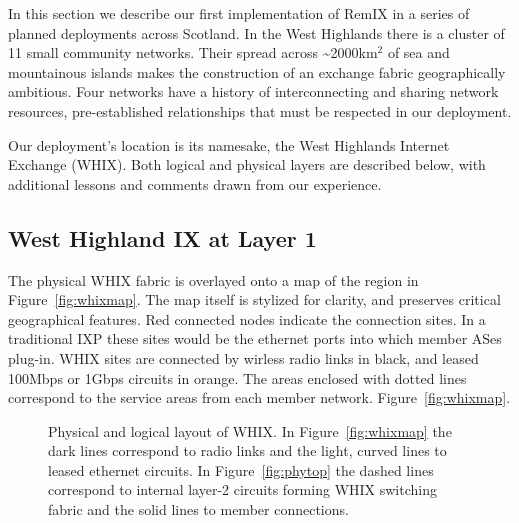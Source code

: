 
In this section we describe our first implementation of RemIX in a series of planned deployments across Scotland. In the West Highlands there
is a cluster of
11 small community networks. Their spread across \textasciitilde 2000km$^2$
of sea and mountainous islands makes the
construction of an exchange fabric geographically ambitious. Four networks have
a history of interconnecting and sharing network resources, pre-established
relationships that must be respected in our deployment.

Our deployment's location is its namesake, the West Highlands Internet
Exchange (WHIX). Both logical and physical layers are described below, with
additional lessons and comments drawn from our experience.

\subsection{West Highland IX at Layer 1}

The physical \ac{WHIX} fabric is overlayed onto a map of the region in
Figure~\ref{fig:whixmap}. The map itself is stylized for clarity, and
preserves critical geographical features. Red connected nodes indicate
the connection sites. In a traditional IXP these sites would be the
ethernet ports into which member ASes plug-in. WHIX sites are
connected by wirless radio links in black, and leased 100Mbps or 1Gbps
circuits in orange. The areas enclosed with dotted lines correspond to
the service areas from each member network.
Figure~\ref{fig:whixmap}.
\begin{figure*}
  \centering
  \hspace{\columnsep}
  \caption{Physical and logical layout of \ac{WHIX}. In
  Figure~\ref{fig:whixmap} the dark lines correspond to radio links
  and the light, curved lines to leased ethernet circuits.
  In Figure~\ref{fig:phytop} the dashed lines
  correspond to internal layer-2 circuits forming \ac{WHIX}
  switching fabric and the solid lines to member connections.}
\end{figure*}

